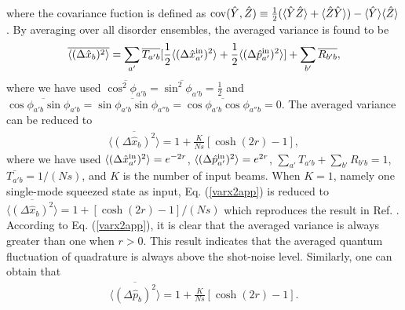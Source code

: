 \documentclass[9pt,twocolumn,twoside]{osajnl}
\begin{document}
where the covariance fuction is defined as ${\rm{cov}}(\hat{Y},\hat{Z}) \equiv \frac{1}{2} (\langle \hat{Y} \hat{Z} \rangle +\langle \hat{Z} \hat{Y} \rangle) - \langle \hat{Y}\rangle \langle \hat{Z} \rangle $. By averaging over all disorder ensembles, the averaged variance is found to be
\begin{align}
\label{sqz1var200}
\overline{\langle (\Delta \hat{x}_{b})^2 \rangle} = \sum_{a'} \overline{T_{a'b}} [\frac{1}{2} \langle (\Delta \hat{x}_{a'}^{\rm{in}})^2 \rangle + \frac{1}{2} \langle (\Delta \hat{p}_{a'}^{\rm{in}})^2 \rangle] + \sum_{b'} \overline{R_{b'b}},
\end{align}
where we have used $\overline{\cos^2 \phi_{a'b}} = \overline{\sin^2 \phi_{a'b}} = \frac{1}{2}$ and $\overline{\cos \phi_{a'b}\sin \phi_{a'b}} = \overline{\sin \phi_{a'b}\sin \phi_{a''b}} = \overline{\cos \phi_{a'b}\cos \phi_{a''b}} =0$.  The averaged variance can be reduced to
\begin{align}
\label{varx2app}
\overline{\langle (\Delta \hat{x}_{b})^2 \rangle} = 1+ \frac{K}{Ns} [\cosh (2r) - 1],
\end{align}
where we have used $\langle (\Delta \hat{x}_{a'}^{\rm{in}})^2 \rangle = e^{-2r}$, $\langle (\Delta \hat{p}_{a'}^{\rm{in}})^2 \rangle = e^{2r}$, $\sum_{a'} T_{a'b} + \sum_{b'} R_{b'b} = 1$, $\overline{T_{a'b}} = 1/(Ns)$, and $K$ is the number of input beams. When $K = 1$, namely one single-mode squeezed state as input, Eq. (\ref{varx2app}) is reduced to $\overline{\langle (\Delta \hat{x}_{b})^2 \rangle} = 1+  [\cosh (2r) - 1]/ (Ns)$ which reproduces the result in Ref. \cite{lodahl2006b}. According to Eq. (\ref{varx2app}), it is clear that the averaged variance is always greater than one when $r>0$. This result indicates that the averaged quantum fluctuation of quadrature is always above the shot-noise level. Similarly, one can obtain that 
\begin{align}
\label{varp2app}
\overline{\langle (\Delta \hat{p}_{b})^2 \rangle} = 1+ \frac{K}{Ns} [\cosh (2r) - 1].
\end{align}
\end{document}

